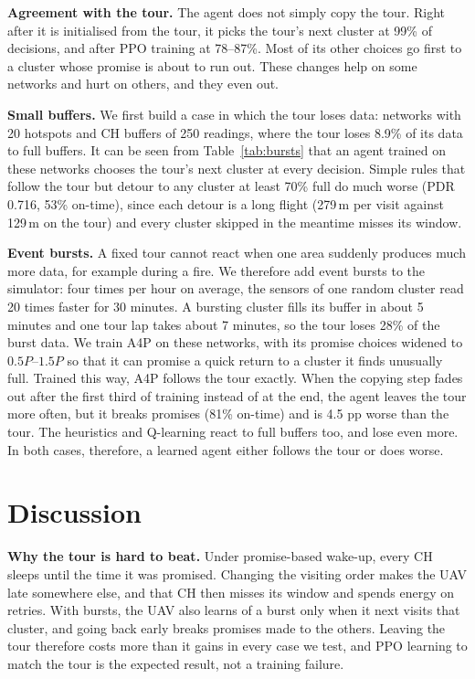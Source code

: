 \documentclass[conference]{IEEEtran}
\begin{document}
\textbf{Agreement with the tour.} The agent does not simply copy the tour. Right after it is
initialised from the tour, it picks the tour's next cluster at 99\% of decisions, and after PPO
training at 78--87\%. Most of its other choices go first to a cluster whose promise is about to
run out. These changes help on some networks and hurt on others, and they even out.

\textbf{Small buffers.} We first build a case in which the tour loses data: networks with 20
hotspots and CH buffers of 250 readings, where the tour loses 8.9\% of its data to full buffers.
It can be seen from Table~\ref{tab:bursts} that an agent trained on these networks chooses the
tour's next cluster at every decision. Simple rules that follow the tour but detour to any
cluster at least 70\% full do much worse (PDR 0.716, 53\% on-time), since each detour is a long
flight (279\,m per visit against 129\,m on the tour) and every cluster skipped in the meantime
misses its window.

\textbf{Event bursts.} A fixed tour cannot react when one area suddenly produces much more data,
for example during a fire. We therefore add event bursts to the simulator: four times per hour
on average, the sensors of one random cluster read 20 times faster for 30 minutes. A bursting
cluster fills its buffer in about 5 minutes and one tour lap takes about 7 minutes, so the tour
loses 28\% of the burst data. We train A4P on these networks, with its promise choices widened to
$0.5P$--$1.5P$ so that it can promise a quick return to a cluster it finds unusually full. Trained
this way, A4P follows the tour exactly. When the copying step fades out after the first third of
training instead of at the end, the agent leaves the tour more often, but it breaks promises
(81\% on-time) and is 4.5 pp worse than the tour. The heuristics and Q-learning react to full
buffers too, and lose even more. In both cases, therefore, a learned agent either follows the
tour or does worse.

\section{Discussion}\label{sec:discussion}

\textbf{Why the tour is hard to beat.} Under promise-based wake-up, every CH sleeps until the
time it was promised. Changing the visiting order makes the UAV late somewhere else, and that CH
then misses its window and spends energy on retries. With bursts, the UAV also learns of a burst
only when it next visits that cluster, and going back early breaks promises made to the others.
Leaving the tour therefore costs more than it gains in every case we test, and PPO learning to
match the tour is the expected result, not a training failure.
\end{document}
